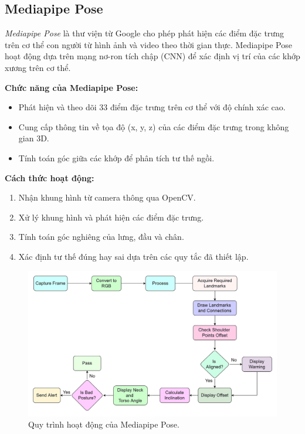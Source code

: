 \documentclass[journal,onecolumn]{IEEEtran}
\begin{document}
\subsection{\textbf{Mediapipe Pose}}
\textit{Mediapipe Pose} là thư viện từ Google cho phép phát hiện các điểm đặc trưng trên cơ thể con người từ hình ảnh và video theo thời gian thực. Mediapipe Pose hoạt động dựa trên mạng nơ-ron tích chập (CNN) để xác định vị trí của các khớp xương trên cơ thể.

\textbf{Chức năng của Mediapipe Pose:}
\begin{itemize}
    \item Phát hiện và theo dõi 33 điểm đặc trưng trên cơ thể với độ chính xác cao.
    \item Cung cấp thông tin về tọa độ (x, y, z) của các điểm đặc trưng trong không gian 3D.
    \item Tính toán góc giữa các khớp để phân tích tư thế ngồi.
\end{itemize}

\textbf{Cách thức hoạt động:}
\begin{enumerate}
    \item Nhận khung hình từ camera thông qua OpenCV.
    \item Xử lý khung hình và phát hiện các điểm đặc trưng.
    \item Tính toán góc nghiêng của lưng, đầu và chân.
    \item Xác định tư thế đúng hay sai dựa trên các quy tắc đã thiết lập.
\end{enumerate}

\begin{figure}[H]
    \centering
    \includegraphics[width=0.7\linewidth]{images/mediapipe_workflow.png}
    \caption{Quy trình hoạt động của Mediapipe Pose.}
    \label{fig:mediapipe_workflow}
\end{figure}
\end{document}
